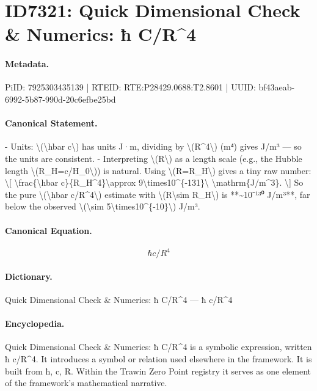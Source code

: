 \section*{ID7321: Quick Dimensional Check \& Numerics: ħ C/R\textasciicircum{}4}
\paragraph{Metadata.}
PiID: 7925303435139 | RTEID: RTE:P28429.0688:T2.8601 | UUID: bf43aeab-6992-5b87-990d-20c6efbe25bd

\paragraph{Canonical Statement.}
- Units: \textbackslash{}(\textbackslash{}hbar c\textbackslash{}) has units J·m, dividing by \textbackslash{}(R\textasciicircum{}4\textbackslash{}) (m⁴) gives J/m³ — so the units are consistent. - Interpreting \textbackslash{}(R\textbackslash{}) as a length scale (e.g., the Hubble length \textbackslash{}(R\_H=c/H\_0\textbackslash{})) is natural. Using \textbackslash{}(R=R\_H\textbackslash{}) gives a tiny raw number: \textbackslash{}[ \textbackslash{}frac\{\textbackslash{}hbar c\}\{R\_H\textasciicircum{}4\}\textbackslash{}approx 9\textbackslash{}times10\textasciicircum{}\{-131\}\textbackslash{} \textbackslash{}mathrm\{J/m\textasciicircum{}3\}. \textbackslash{}] So the pure \textbackslash{}(\textbackslash{}hbar c/R\textasciicircum{}4\textbackslash{}) estimate with \textbackslash{}(R\textbackslash{}sim R\_H\textbackslash{}) is **\textasciitilde{}10⁻¹³⁰ J/m³**, far below the observed \textbackslash{}(\textbackslash{}sim 5\textbackslash{}times10\textasciicircum{}\{-10\}\textbackslash{}) J/m³.

\paragraph{Canonical Equation.}
\[
\hbar c/R^4
\]

\paragraph{Dictionary.}
Quick Dimensional Check \& Numerics: ħ C/R\textasciicircum{}4 — ħ c/R\textasciicircum{}4

\paragraph{Encyclopedia.}
Quick Dimensional Check \& Numerics: ħ C/R\textasciicircum{}4 is a symbolic expression, written ħ c/R\textasciicircum{}4. It introduces a symbol or relation used elsewhere in the framework. It is built from ħ, c, R. Within the Trawin Zero Point registry it serves as one element of the framework's mathematical narrative.
